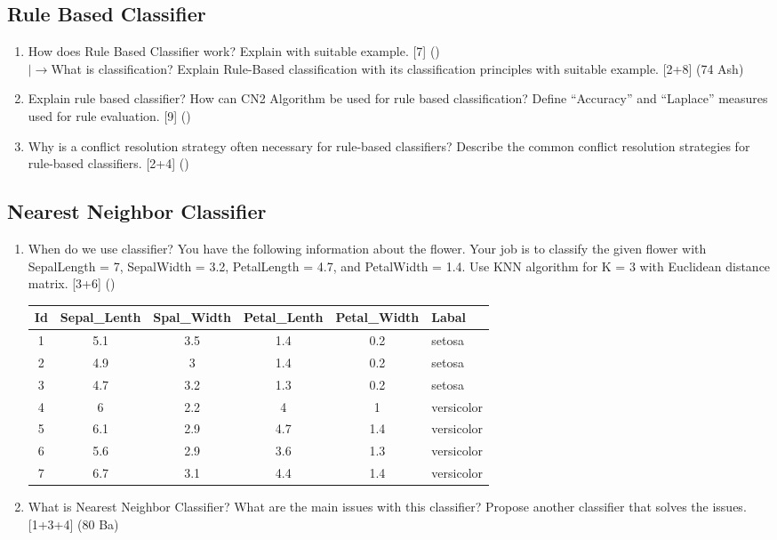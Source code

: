 \documentclass[12pt]{article}
\newcommand{\lb}{\\$\left|\rightarrow\right.$}
\begin{document}
  \subsection{Rule Based Classifier}
    \begin{enumerate}[topsep=0pt, noitemsep]
      \item How does Rule Based Classifier work? Explain with suitable example. \hfill [7] ()
        \lb What is classification? Explain Rule-Based classification with its classification principles with suitable example. \hfill [2+8] (74 Ash)

      \item Explain rule based classifier? How can CN2 Algorithm be used for rule based classification? Define ``Accuracy'' and ``Laplace'' measures used for rule evaluation. \hfill [9] ()

      \item Why is a conflict resolution strategy often necessary for rule-based classifiers? Describe the common conflict resolution strategies for rule-based classifiers. \hfill [2+4] ()
    \end{enumerate}

  \subsection{Nearest Neighbor Classifier}
    \begin{enumerate}[topsep=0pt, noitemsep]
      \item When do we use classifier? You have the following information about the flower. Your job is to classify the given flower with SepalLength = 7, SepalWidth = 3.2, PetalLength = 4.7, and PetalWidth = 1.4. Use KNN algorithm for K = 3 with Euclidean distance matrix. \hfill [3+6] ()\\
        \small
        \begin{tabular}{|c|c|c|c|c|l|}
          \hline
          Id & Sepal\_Lenth & Spal\_Width & Petal\_Lenth & Petal\_Width & Labal \\ \hline
          1 & 5.1 & 3.5 & 1.4 & 0.2 & setosa \\ \hline
          2 & 4.9 & 3 & 1.4 & 0.2 & setosa \\ \hline
          3 & 4.7 & 3.2 & 1.3 & 0.2 & setosa \\ \hline
          4 & 6 & 2.2 & 4 & 1 & versicolor \\ \hline
          5 & 6.1 & 2.9 & 4.7 & 1.4 & versicolor \\ \hline
          6 & 5.6 & 2.9 & 3.6 & 1.3 & versicolor \\ \hline
          7 & 6.7 & 3.1 & 4.4 & 1.4 & versicolor \\ \hline
        \end{tabular}
        \normalsize

      \item What is Nearest Neighbor Classifier? What are the main issues with this classifier? Propose another classifier that solves the issues. \hfill [1+3+4] (80 Ba)
    \end{enumerate}
\end{document}

